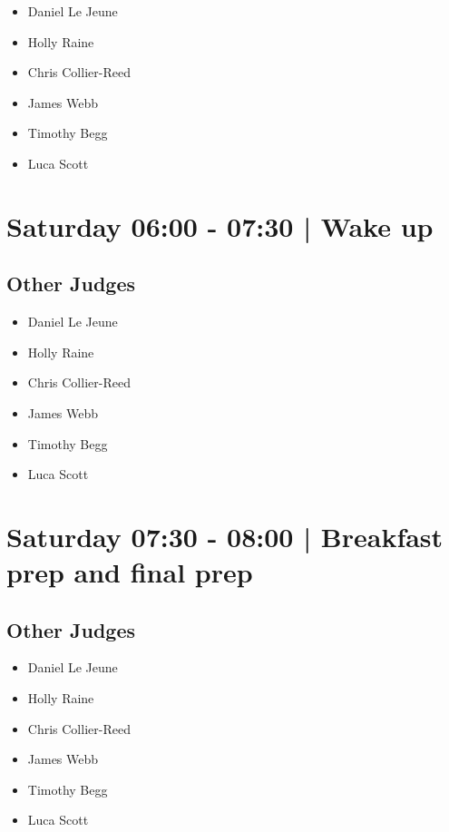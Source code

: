 \documentclass[10pt, A5]{article}
\begin{document}
            \begin{itemize}
                            \item Daniel Le Jeune
                            \item Holly Raine
                            \item Chris Collier-Reed
                            \item James Webb
                            \item Timothy Begg
                            \item Luca Scott
                        \end{itemize}
        

            \section*{Saturday 06:00
        -
        07:30
        |
         Wake up}
        
                
        \subsection*{Other Judges}
        
            \begin{itemize}
                            \item Daniel Le Jeune
                            \item Holly Raine
                            \item Chris Collier-Reed
                            \item James Webb
                            \item Timothy Begg
                            \item Luca Scott
                        \end{itemize}
        

            \section*{Saturday 07:30
        -
        08:00
        |
         Breakfast prep and final prep}
        
                
        \subsection*{Other Judges}
        
            \begin{itemize}
                            \item Daniel Le Jeune
                            \item Holly Raine
                            \item Chris Collier-Reed
                            \item James Webb
                            \item Timothy Begg
                            \item Luca Scott
                        \end{itemize}
        
\end{document}
